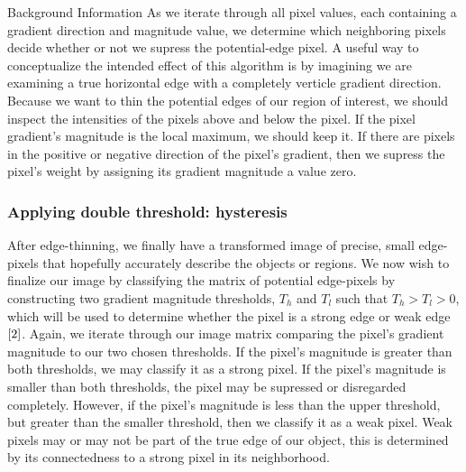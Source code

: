\documentclass[a4paper,12pt]{article}
\begin{document}
\begin{section}{Background Information}
As we iterate through all pixel values, each containing a gradient direction and magnitude value, we determine which neighboring pixels decide whether or not we supress the potential-edge pixel.
A useful way to conceptualize the intended effect of this algorithm is by imagining we are examining a true horizontal edge with a completely verticle gradient direction.
Because we want to thin the potential edges of our region of interest, we should inspect the intensities of the pixels above and below the pixel.
If the pixel gradient's magnitude is the local maximum, we should keep it. 
If there are pixels in the positive or negative direction of the pixel's gradient, then we supress the pixel's weight by assigning its gradient magnitude a value zero.

\subsubsection{Applying double threshold: hysteresis}

After edge-thinning, we finally have a transformed image of precise, small edge-pixels that hopefully accurately describe the objects or regions.
We now wish to finalize our image by classifying the matrix of potential edge-pixels by constructing two gradient magnitude thresholds, $T_h$ and $T_l$ such that $T_h$$>$$T_l$$>$$0$, which will be used to determine whether the pixel is a strong edge or weak edge$\cite{2}$.%
Again, we iterate through our image matrix comparing the pixel's gradient magnitude to our two chosen thresholds.
If the pixel's magnitude is greater than both thresholds, we may classify it as a strong pixel.
If the pixel's magnitude is smaller than both thresholds, the pixel may be supressed or disregarded completely.
However, if the pixel's magnitude is less than the upper threshold, but greater than the smaller threshold, then we classify it as a weak pixel.
Weak pixels may or may not be part of the true edge of our object, this is determined by its connectedness to a strong pixel in its neighborhood.\\


\end{section}
\end{document}
